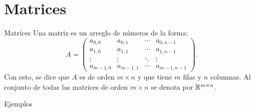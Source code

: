 \section{Matrices}


\begin{frame}

    \begin{block}{Matrices}
        Una matriz es un arreglo de números de la forma:
        \[
            A = 
            \begin{pmatrix}
            a_{0,0} & a_{0,1} & \cdots & a_{0,n-1} \\ 
            a_{1,0} & a_{1,1} & \cdots & a_{1,n-1} \\ 
            \vdots & \vdots & \ddots & \vdots\\ 
            a_{m-1,0} & a_{m-1,1} & \cdots & a_{m-1,n-1}
            \end{pmatrix}.
        \]
        Con esto, se dice que $A$ es de orden $m \times n$ y que tiene $m$ filas y $n$ columnas. Al conjunto de todas las matrices de orden $m \times n$ se denota por $\Mat[\R]{m}{n}$.
    \end{block}

\end{frame}


\begin{frame}{Ejemplos}

\end{frame}





